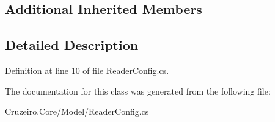\subsection*{Additional Inherited Members}


\subsection{Detailed Description}


Definition at line 10 of file Reader\+Config.\+cs.



The documentation for this class was generated from the following file\+:\begin{DoxyCompactItemize}
\item 
Cruzeiro.\+Core/\+Model/Reader\+Config.\+cs\end{DoxyCompactItemize}
